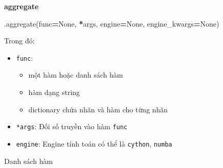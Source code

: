 \documentclass[
]{book}
\newenvironment{Shaded}{\begin{snugshade}}{\end{snugshade}}
\newcommand{\NormalTok}[1]{#1}
\newcommand{\OperatorTok}[1]{\textcolor[rgb]{0.81,0.36,0.00}{\textbf{#1}}}
\newcommand{\VariableTok}[1]{\textcolor[rgb]{0.00,0.00,0.00}{#1}}
\begin{document}
\textbf{aggregate}

\begin{Shaded}
\begin{Highlighting}[]
\NormalTok{.aggregate(func}\OperatorTok{=}\VariableTok{None}\NormalTok{, }\OperatorTok{*}\NormalTok{args, engine}\OperatorTok{=}\VariableTok{None}\NormalTok{, engine\_kwargs}\OperatorTok{=}\VariableTok{None}\NormalTok{)}
\end{Highlighting}
\end{Shaded}

Trong đó:

\begin{itemize}
\item
  \texttt{func}:

  \begin{itemize}
  \item
    một hàm hoặc danh sách hàm
  \item
    hàm dạng string
  \item
    dictionary chứa nhãn và hàm cho từng nhãn
  \end{itemize}
\item
  \texttt{*args}: Đối số truyền vào hàm \texttt{func}
\item
  \texttt{engine}: Engine tính toán có thể là \texttt{cython}, \texttt{numba}
\end{itemize}

Danh sách hàm
\end{document}
